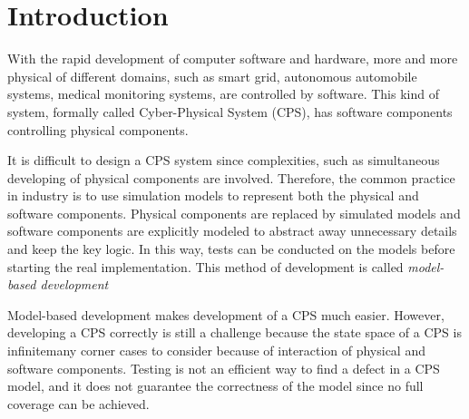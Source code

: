 \section{Introduction}\label{sec:introduction}

With the rapid development of computer software and hardware, more and more physical \DIFdelbegin {}\DIFdelend \DIFaddbegin {}\DIFaddend of different domains, such as smart grid, autonomous automobile systems, medical monitoring systems, are controlled by software.
This kind of system, formally called Cyber-Physical System (CPS), has software components controlling physical components\DIFdelbegin {}\DIFdelend .

It is difficult to design a CPS system since complexities, such as simultaneous developing of physical components are involved.
Therefore, the common practice in industry is to use simulation models to represent both the physical and software components.
Physical components are replaced by simulated models and software components are explicitly modeled to abstract away unnecessary details and keep the key logic.
In this way, tests can be conducted on the models before starting the real implementation.
This method of development is called \emph{model-based development}\DIFaddbegin {}\DIFaddend %

Model-based development makes development of a CPS much easier.
However, developing a CPS correctly is still a challenge \DIFdelbegin \DIFdel{, }\DIFdelend because the state space of a CPS is infinite\DIFdelbegin {}\DIFdelend \DIFaddbegin {}\DIFaddend many corner cases to consider because of interaction of physical and software components.
Testing is not an efficient way to find a defect in a CPS model, and it does not guarantee the correctness of the model since no full coverage can be achieved.
\DIFaddbegin {}
\DIFaddend %

